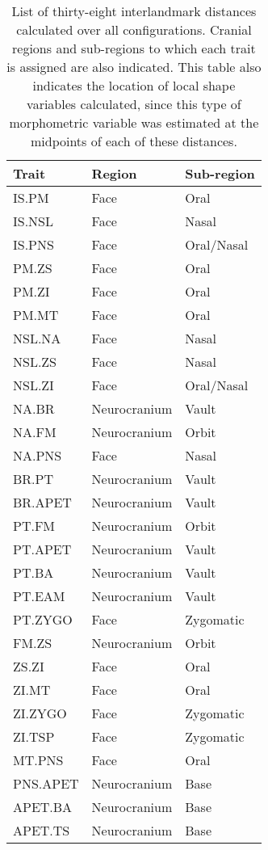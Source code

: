 \begin {table}[hp]
  \centering
  \caption {List of thirty-eight interlandmark distances calculated over all configurations. Cranial regions and sub-regions to which each trait is assigned are also indicated. This table also indicates the location of local shape variables calculated, since this type of morphometric variable was estimated at the midpoints of each of these distances.}
  \label {tab:dist}
  \hr
  \begin {tabularx} {\textwidth} {X X X}
    {\bf Trait} & {\bf Region} & {\bf Sub-region}  \\
    \hline
    IS.PM & Face & Oral \\
    IS.NSL & Face & Nasal \\
    IS.PNS & Face & Oral/Nasal \\
    PM.ZS & Face & Oral \\
    PM.ZI & Face & Oral \\
    PM.MT & Face & Oral \\
    NSL.NA & Face & Nasal \\
    NSL.ZS & Face & Nasal \\
    NSL.ZI & Face & Oral/Nasal \\
    NA.BR & Neurocranium & Vault \\
    NA.FM & Neurocranium & Orbit \\
    NA.PNS & Face & Nasal \\
    BR.PT & Neurocranium & Vault \\
    BR.APET & Neurocranium & Vault \\
    PT.FM & Neurocranium & Orbit \\
    PT.APET & Neurocranium & Vault \\
    PT.BA & Neurocranium & Vault \\
    PT.EAM & Neurocranium & Vault \\
    PT.ZYGO & Face & Zygomatic \\
    FM.ZS & Neurocranium & Orbit \\
    ZS.ZI & Face & Oral \\
    ZI.MT & Face & Oral \\
    ZI.ZYGO & Face & Zygomatic \\
    ZI.TSP & Face & Zygomatic \\
    MT.PNS & Face & Oral \\
    PNS.APET & Neurocranium & Base \\
    APET.BA & Neurocranium & Base \\
    APET.TS & Neurocranium & Base \\

\end{tabularx}
\end{table}
